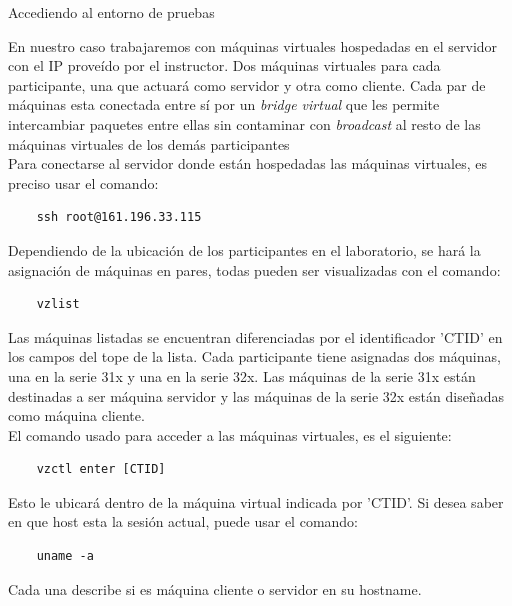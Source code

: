 \begin{frame}{Accediendo al entorno de pruebas}

    En nuestro caso trabajaremos con máquinas virtuales hospedadas en el
    servidor con el IP proveído por el instructor. Dos máquinas virtuales para
    cada participante, una que actuará como servidor y otra como
    cliente. Cada par de máquinas esta conectada entre sí por un
    \textit{bridge virtual} que les permite intercambiar paquetes entre ellas
    sin contaminar con \textit{broadcast} al resto de las máquinas virtuales de
    los demás participantes\\[0.2cm] 

    Para conectarse al servidor donde están hospedadas las máquinas virtuales,
    es preciso usar el comando:\\[0.2cm]

\begin{verbatim}
    ssh root@161.196.33.115
\end{verbatim} 

    \framebreak

    Dependiendo de la ubicación de los participantes en el
    laboratorio, se hará la asignación de máquinas en pares,
    todas pueden ser visualizadas con el comando:\\[0.2cm]

\begin{verbatim}
    vzlist
\end{verbatim} 
     
    Las máquinas listadas se encuentran diferenciadas por el identificador
    'CTID' en los campos del tope de la lista.  Cada participante tiene
    asignadas dos máquinas, una en la serie 31x y una en la serie 32x.
    Las máquinas de la serie 31x están destinadas a ser máquina servidor
    y las máquinas de la serie 32x están diseñadas como máquina cliente.\\[0.2cm]

    El comando usado para acceder a las máquinas virtuales, es el siguiente:

\begin{verbatim}
    vzctl enter [CTID]
\end{verbatim}

    Esto le ubicará dentro de la máquina virtual indicada por 'CTID'.
    Si desea saber en que host esta la sesión actual, puede usar el
    comando:\\[0.2cm]

\begin{verbatim}
    uname -a
\end{verbatim}

    Cada una describe si es máquina cliente o servidor en su hostname.
    
\end{frame}

